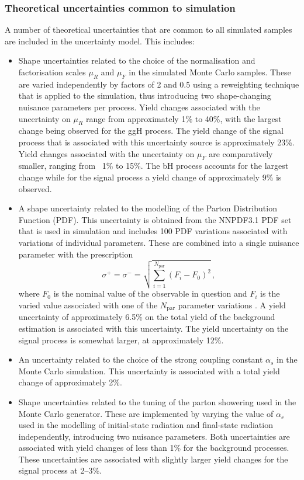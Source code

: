 \subsubsection{Theoretical uncertainties common to simulation}
A number of theoretical uncertainties that are common to all simulated samples are included in the uncertainty model. This includes:
\begin{itemize}
    \item Shape uncertainties related to the choice of the normalisation and factorisation scales $\mu_R$ and $\mu_F$ in the simulated Monte Carlo samples. These are varied independently by factors of 2 and 0.5 using a reweighting technique that is applied to the simulation, thus introducing two shape-changing nuisance parameters per process. Yield changes associated with the uncertainty on $\mu_R$ range from  approximately 1\% to 40\%, with the largest change being observed for the ggH process. The yield change of the signal process that is associated with this uncertainty source is approximately 23\%. Yield changes associated with the uncertainty on $\mu_F$ are comparatively smaller, ranging from ~1\% to 15\%. The bH process accounts for the largest change while for the signal process a yield change of approximately 9\% is observed.
    \item A shape uncertainty related to the modelling of the Parton Distribution Function (PDF). This uncertainty is obtained from the \textsf{NNPDF3.1} PDF set that is used in simulation \cite{NNPDF3.1} and includes 100 PDF variations associated with variations of individual parameters. These are combined into a single nuisance parameter with the prescription   
    \begin{equation}
    \label{eq:symmhessian}
    \sigma^+ = \sigma^- = \sqrt{\sum_{i=1}^{N_{\text{par}}} \left( F_i - F_0 \right)^2}\,,
    \end{equation}
    where $F_0$ is the nominal value of the observable in question and $F_i$ is the varied value associated with one of the $N_{\text{par}}$ parameter variations \cite{Butterworth_2016}. A yield uncertainty of approximately 6.5\% on the total yield of the background estimation is associated with this uncertainty. The yield uncertainty on the signal process is somewhat larger, at approximately 12\%. 
    \item An uncertainty related to the choice of the strong coupling constant $\alpha_s$ in the Monte Carlo simulation. This uncertainty is associated with a total yield change of approximately 2\%.
    \item Shape uncertainties related to the tuning of the parton showering used in the Monte Carlo generator. These are implemented by varying the value of $\alpha_{s}$ used in the modelling of initial-state radiation and final-state radiation independently, introducing two nuisance parameters. Both uncertainties are associated with yield changes of less than 1\% for the background processes. These uncertainties are associated with slightly larger yield changes for the signal process at 2--3\%. 
\end{itemize}
